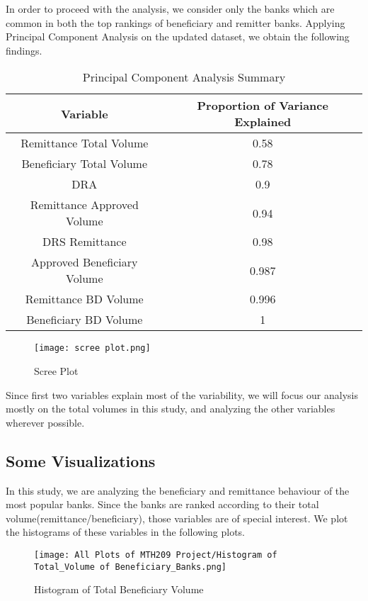\documentclass{article}
\begin{document}
In order to proceed with the analysis, we consider only the banks which are common in both the top rankings of beneficiary and remitter banks. Applying Principal Component Analysis on the updated dataset, we obtain the following findings.

\begin{table}[htbp]
\centering
\caption{Principal Component Analysis Summary}
\begin{tabular}{|c|c|}
\hline
\textbf{Variable} & \textbf{Proportion of Variance Explained} \\
\hline
Remittance Total Volume & 0.58 \\
Beneficiary Total Volume & 0.78 \\
DRA & 0.9 \\
Remittance Approved Volume & 0.94 \\
DRS Remittance & 0.98 \\
Approved Beneficiary Volume & 0.987 \\
Remittance BD Volume & 0.996 \\
Beneficiary BD Volume & 1 \\
\hline
\end{tabular}
\end{table}

\begin{figure}[H]
    \centering
    \texttt{[image: scree plot.png]}
    \caption{Scree Plot}
    \label{fig:example}
\end{figure}

Since first two variables explain most of the variability, we will focus our analysis mostly on the total volumes in this study, and analyzing the other variables wherever possible.

\subsection{Some Visualizations}

In this study, we are analyzing the beneficiary and remittance behaviour of the most popular banks. Since the banks are ranked according to their total volume(remittance/beneficiary), those variables are of special interest. We plot the histograms of these variables in the following plots.

\begin{figure}[H]
    \centering
    \texttt{[image: All Plots of MTH209 Project/Histogram of Total\_Volume of Beneficiary\_Banks.png]}
    \caption{Histogram of Total Beneficiary Volume}
    \label{fig:example}
\end{figure}
\end{document}
